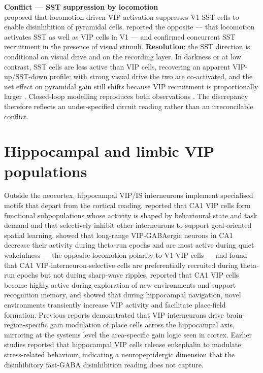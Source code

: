 \documentclass[11pt]{article}
\begin{document}
\begin{framed}
\textbf{Conflict --- SST suppression by locomotion}\\
\citet{Fu2014} proposed that locomotion-driven VIP activation suppresses V1 SST cells to enable disinhibition of pyramidal cells. \citet{Pakan2016} reported the opposite --- that locomotion activates SST as well as VIP cells in V1 --- and \citet{Dipoppa2018} confirmed concurrent SST recruitment in the presence of visual stimuli. \textbf{Resolution}: the SST direction is conditional on visual drive and on the recording layer. In darkness or at low contrast, SST cells are less active than VIP cells, recovering an apparent VIP-up/SST-down profile; with strong visual drive the two are co-activated, and the net effect on pyramidal gain still shifts because VIP recruitment is proportionally larger \citep{Pakan2016, Dipoppa2018, Veit2023}. Closed-loop modelling reproduces both observations \citep{Dipoppa2018, Veit2023}. The discrepancy therefore reflects an under-specified circuit reading rather than an irreconcilable conflict.
\end{framed}

\section{Hippocampal and limbic VIP populations}

Outside the neocortex, hippocampal VIP/IS interneurons implement specialised motifs that depart from the cortical reading. \citet{Turi2019} reported that CA1 VIP cells form functional subpopulations whose activity is shaped by behavioural state and task demand and that selectively inhibit other interneurons to support goal-oriented spatial learning. \citet{Francavilla2018a} showed that long-range VIP-GABAergic neurons in CA1 decrease their activity during theta-run epochs and are most active during quiet wakefulness --- the opposite locomotion polarity to V1 VIP cells --- and \citet{Luo2020} found that CA1 VIP-interneuron-selective cells are preferentially recruited during theta-run epochs but not during sharp-wave ripples. \citet{Tamboli2024} reported that CA1 VIP cells become highly active during exploration of new environments and support recognition memory, and \citet{Neubrandt2025a} showed that during hippocampal navigation, novel environments transiently increase VIP activity and facilitate place-field formation. Previous reports \citep{Lenkey2025} demonstrated that VIP interneurons drive brain-region-specific gain modulation of place cells across the hippocampal axis, mirroring at the systems level the area-specific gain logic seen in cortex. Earlier studies \citep{Leroy2022} reported that hippocampal VIP cells release enkephalin to modulate stress-related behaviour, indicating a neuropeptidergic dimension that the disinhibitory fast-GABA disinhibition reading does not capture.
\end{document}
